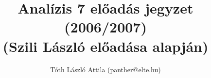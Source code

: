 \documentclass[fleqn,10pt,a4paper,titlepage]{article}
\title{Analízis 7 előadás jegyzet (2006/2007)\\(Szili László előadása alapján)}
\author{Tóth László Attila (panther@elte.hu)}
\date{}
\begin{document}
  \maketitle
  \mktoc
  
  \newpage
  
%  
\end{document}
